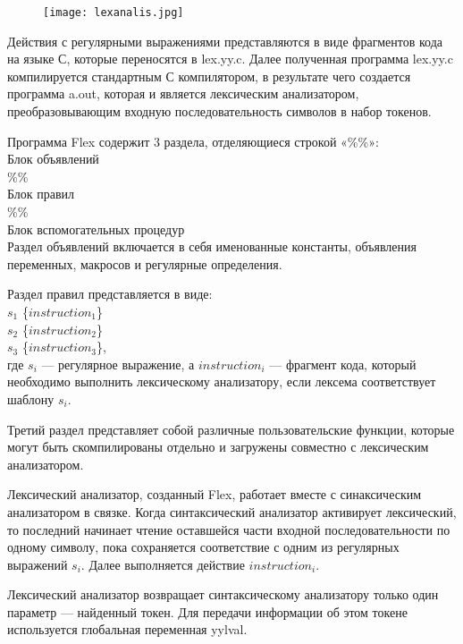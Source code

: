 \documentclass[bachelor, och, coursework, times]{SCWorks}
\begin{document}
\begin{figure}  [!ht]
	\centering
	\texttt{[image: lexanalis.jpg]}
\end{figure}

Действия с регулярными выражениями представляются в виде фрагментов кода на языке С, которые переносятся в lex.yy.c. Далее полученная программа lex.yy.c компилируется стандартным С компилятором, в результате чего создается программа a.out, которая и является лексическим анализатором, преобразовывающим входную последовательность символов в набор токенов.




Программа Flex содержит 3 раздела, отделяющиеся строкой «\%\%»: \\
Блок объявлений \\
\%\% \\
Блок правил \\
\%\% \\
Блок вспомогательных процедур \\

Раздел объявлений включается в себя именованные константы, объявления переменных, макросов и регулярные определения.

Раздел правил представляется в виде: \\
$s_1$ \{$instruction_1$\} \\
$s_2$ \{$instruction_2$\} \\
$s_3$ \{$instruction_3$\}, \\

где $s_i$ --- регулярное выражение, а $instruction_i$ --- фрагмент кода, который необходимо выполнить лексическому анализатору, если лексема соответствует шаблону $s_i$.

Третий раздел представляет собой различные пользовательские функции, которые могут быть скомпилированы отдельно и загружены совместно с лексическим анализатором.

Лексический анализатор, созданный Flex, работает вместе с синаксическим анализатором в связке. Когда синтаксический анализатор активирует лексический, то последний начинает чтение оставшейся части входной последовательности по одному символу, пока сохраняется соответствие с одним из регулярных выражений $s_i$. Далее выполняется действие $instruction_i$.

Лексический анализатор возвращает синтаксическому анализатору только один параметр --- найденный токен. Для передачи информации об этом токене используется глобальная переменная yylval.~\cite{Hunter}
\end{document}
